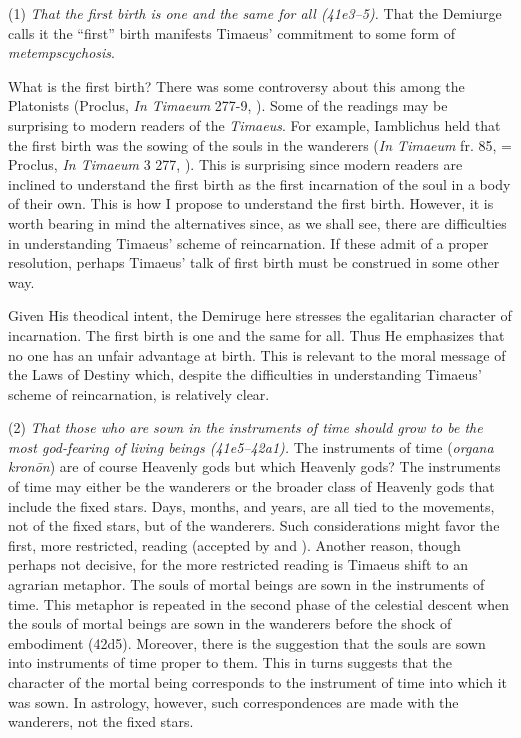 (1) \emph{That the first birth is one and the same for all (41e3--5).} That the Demiurge calls it the ``first'' birth manifests Timaeus' commitment to some form of \emph{metempscychosis}.

What is the first birth? There was some controversy about this among the Platonists (Proclus, \emph{In Timaeum} 277-9, \citealt{Diehl:1903re}). Some of the readings may be surprising to modern readers of the \emph{Timaeus}. For example, Iamblichus held that the first birth was the sowing of the souls in the wanderers (\emph{In Timaeum} fr. 85, \citealt{Dillon:1973qv} = Proclus, \emph{In Timaeum} 3 277, \citealt{Diehl:1903re}). This is surprising since modern readers are inclined to understand the first birth as the first incarnation of the soul in a body of their own. This is how I propose to understand the first birth. However, it is worth bearing in mind the alternatives since, as we shall see, there are difficulties in understanding Timaeus' scheme of reincarnation. If these admit of a proper resolution, perhaps Timaeus' talk of first birth must be construed in some other way.

Given His theodical intent, the Demiruge here stresses the egalitarian character of incarnation. The first birth is one and the same for all. Thus He emphasizes that no one has an unfair advantage at birth. This is relevant to the moral message of the Laws of Destiny which, despite the difficulties in understanding Timaeus' scheme of reincarnation, is relatively clear.

(2) \emph{That those who are sown in the instruments of time should grow to be the most god-fearing of living beings (41e5--42a1).} The instruments of time (\emph{organa kronōn}) are of course Heavenly gods but which Heavenly gods? The instruments of time may either be the wanderers or the broader class of Heavenly gods that include the fixed stars. Days, months, and years, are all tied to the movements, not of the fixed stars, but of the wanderers. Such considerations might favor the first, more restricted, reading (accepted by \citealt[143 n4]{Archer-Hind:1888qd} and \citealt[258--9]{Taylor:1928qb}). Another reason, though perhaps not decisive, for the more restricted reading is Timaeus shift to an agrarian metaphor. The souls of mortal beings are sown in the instruments of time. This metaphor is repeated in the second phase of the celestial descent when the souls of mortal beings are sown in the wanderers before the shock of embodiment (42d5). Moreover, there is the suggestion that the souls are sown into instruments of time proper to them. This in turns suggests that the character of the mortal being corresponds to the instrument of time into which it was sown. In astrology, however, such correspondences are made with the wanderers, not the fixed stars.

